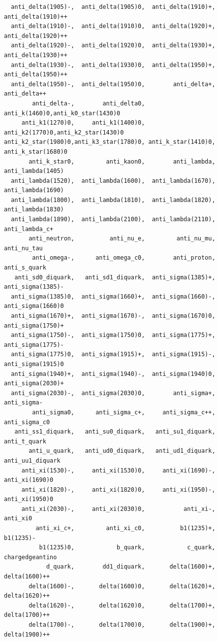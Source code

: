 \documentclass[a4paper,12pt]{article}
\begin{document}
\begin{verbatim}
  anti_delta(1905)-,  anti_delta(1905)0,  anti_delta(1910)+, anti_delta(1910)++
  anti_delta(1910)-,  anti_delta(1910)0,  anti_delta(1920)+, anti_delta(1920)++
  anti_delta(1920)-,  anti_delta(1920)0,  anti_delta(1930)+, anti_delta(1930)++
  anti_delta(1930)-,  anti_delta(1930)0,  anti_delta(1950)+, anti_delta(1950)++
  anti_delta(1950)-,  anti_delta(1950)0,        anti_delta+,       anti_delta++
        anti_delta-,        anti_delta0,      anti_k(1460)0,anti_k0_star(1430)0
     anti_k1(1270)0,     anti_k1(1400)0,     anti_k2(1770)0,anti_k2_star(1430)0
anti_k2_star(1980)0,anti_k3_star(1780)0, anti_k_star(1410)0, anti_k_star(1680)0
       anti_k_star0,         anti_kaon0,        anti_lambda,  anti_lambda(1405)
  anti_lambda(1520),  anti_lambda(1600),  anti_lambda(1670),  anti_lambda(1690)
  anti_lambda(1800),  anti_lambda(1810),  anti_lambda(1820),  anti_lambda(1830)
  anti_lambda(1890),  anti_lambda(2100),  anti_lambda(2110),     anti_lambda_c+
       anti_neutron,          anti_nu_e,         anti_nu_mu,        anti_nu_tau
        anti_omega-,      anti_omega_c0,        anti_proton,       anti_s_quark
   anti_sd0_diquark,   anti_sd1_diquark,  anti_sigma(1385)+,  anti_sigma(1385)-
  anti_sigma(1385)0,  anti_sigma(1660)+,  anti_sigma(1660)-,  anti_sigma(1660)0
  anti_sigma(1670)+,  anti_sigma(1670)-,  anti_sigma(1670)0,  anti_sigma(1750)+
  anti_sigma(1750)-,  anti_sigma(1750)0,  anti_sigma(1775)+,  anti_sigma(1775)-
  anti_sigma(1775)0,  anti_sigma(1915)+,  anti_sigma(1915)-,  anti_sigma(1915)0
  anti_sigma(1940)+,  anti_sigma(1940)-,  anti_sigma(1940)0,  anti_sigma(2030)+
  anti_sigma(2030)-,  anti_sigma(2030)0,        anti_sigma+,        anti_sigma-
        anti_sigma0,      anti_sigma_c+,     anti_sigma_c++,      anti_sigma_c0
   anti_ss1_diquark,   anti_su0_diquark,   anti_su1_diquark,       anti_t_quark
       anti_u_quark,   anti_ud0_diquark,   anti_ud1_diquark,   anti_uu1_diquark
     anti_xi(1530)-,     anti_xi(1530)0,     anti_xi(1690)-,     anti_xi(1690)0
     anti_xi(1820)-,     anti_xi(1820)0,     anti_xi(1950)-,     anti_xi(1950)0
     anti_xi(2030)-,     anti_xi(2030)0,           anti_xi-,           anti_xi0
         anti_xi_c+,         anti_xi_c0,          b1(1235)+,          b1(1235)-
          b1(1235)0,            b_quark,            c_quark,    chargedgeantino
            d_quark,        dd1_diquark,       delta(1600)+,      delta(1600)++
       delta(1600)-,       delta(1600)0,       delta(1620)+,      delta(1620)++
       delta(1620)-,       delta(1620)0,       delta(1700)+,      delta(1700)++
       delta(1700)-,       delta(1700)0,       delta(1900)+,      delta(1900)++

\end{verbatim}
\end{document}
